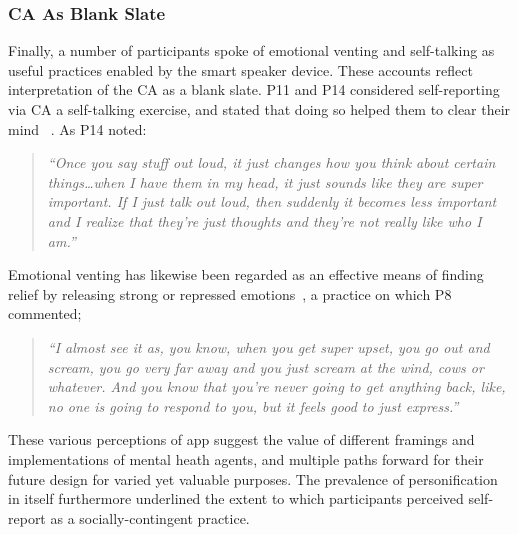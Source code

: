         \subsubsection{\ac{CA} As Blank Slate} %
     
            Finally, a number of participants spoke of emotional venting and self-talking as useful practices enabled by the smart speaker device. These accounts reflect interpretation of the \ac{CA} as a blank slate. P11 and P14 considered self-reporting via \ac{CA} a self-talking exercise, and stated that doing so helped them to clear their mind ~\cite{callicott2003effects,kendall1991guiding,treadwell1996self}. As P14 noted:
            
                \begin{quote}
                \vspace{2mm}
                    \textit{``Once you say stuff out loud, it just changes how you think about certain things\ldots when I have them in my head, it just sounds like they are super important. If I just talk out loud, then suddenly it becomes less important and I realize that they're just thoughts and they're not really like who I am.''} %
                \vspace{2mm}
                \end{quote} 
            
            Emotional venting has likewise been regarded as an effective means of finding relief by releasing strong or repressed emotions~\cite{bennett1991irrationality, tonnaer2020explosive, leslie2008boxing}, a practice on which P8 commented;
            
                \begin{quote}
                \vspace{2mm}
                    \textit{``I almost see it as, you know, when you get super upset, you go out and scream, you go very far away and you just scream at the wind, cows or whatever. And you know that you're never going to get anything back, like, no one is going to respond to you, but it feels good to just express.''} %
                \vspace{2mm}
                \end{quote} 
            
            These various perceptions of \acl{app} suggest the value of different framings and implementations of mental heath agents, and multiple paths forward for their future design for varied yet valuable purposes. The prevalence of personification in itself furthermore underlined the extent to which participants perceived self-report as a socially-contingent practice.        


